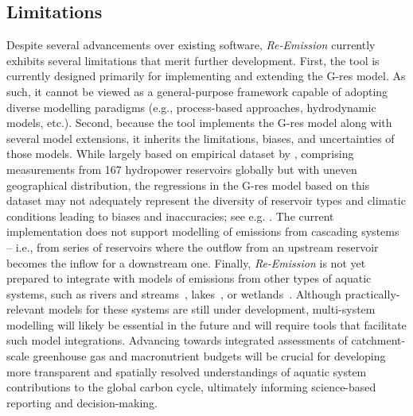 \documentclass[final,1p,times]{elsarticle}
\begin{document}
\subsection{Limitations}
\label{subsec:limitations}


Despite several advancements over existing software, \emph{Re-Emission} currently exhibits several limitations that merit further development.
First, the tool is currently designed primarily for implementing and extending the G-res model. 
As such, it cannot be viewed as a general-purpose framework capable of adopting diverse modelling paradigms (e.g., process-based approaches, hydrodynamic models, etc.). 
Second, because the tool implements the G-res model along with several model extensions, it inherits the limitations, biases, and uncertainties of those models. 
While largely based on empirical dataset by \citet{Deemer2016}, comprising measurements from 167 hydropower reservoirs globally but with uneven geographical distribution, the regressions in the G-res model based on this dataset may not adequately represent the diversity of reservoir types and climatic conditions leading to biases and inaccuracies; see e.g. \citet{Hansen2022}.
The current implementation does not support modelling of emissions from cascading systems -- i.e., from series of reservoirs where the outflow from an upstream reservoir becomes the inflow for a downstream one. 
Finally, \emph{Re-Emission} is not yet prepared to integrate with models of emissions from other types of aquatic systems, such as rivers and streams~\cite{Rocher-Ros2023}, lakes~\cite{Zhuang2023}, or wetlands~\cite{Hu2024}. 
Although practically-relevant models for these systems are still under development, multi-system modelling will likely be essential in the future and will require tools that facilitate such model integrations. 
Advancing towards integrated assessments of catchment-scale greenhouse gas and macronutrient budgets will be crucial for developing more transparent and spatially resolved understandings of aquatic system contributions to the global carbon cycle, ultimately informing science-based reporting and decision-making.
\end{document}
